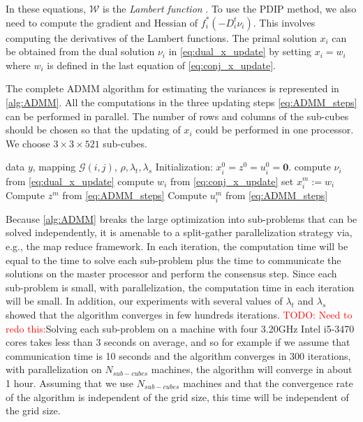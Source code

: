 \documentclass{article}
\newcommand{\attn}[1]{\textcolor{red}{TODO: #1}}
\begin{document}
In these equations, $\mathscr{W}$ is the \textit{Lambert function}
\citep{corless_lambertw_1996}. To use the PDIP method, we also need to
compute the gradient and Hessian of $f_i^*(-D_i^t\nu_i)$. This
involves computing the derivatives of the Lambert functions. The
primal solution $x_i$ can be obtained from the dual solution $\nu_i$
in \eqref{eq:dual_x_update} by setting $x_i=w_i$ where $w_i$ is
defined in the last equation of \eqref{eq:conj_x_update}.  

The complete ADMM algorithm for estimating the variances is
represented in \autoref{alg:ADMM}. All the computations in the three
updating steps \eqref{eq:ADMM_steps} can be performed in parallel. The
number of rows and columns of the sub-cubes should be chosen so that
the updating of $x_i$ could be performed in one processor. We choose
$3\times3\times521$ sub-cubes. 

\begin{algorithm}[tb]
  \caption{ADMM for sparse estimation of variance of spatio-temporal
    data \attn{Fix this}}
  \label{alg:ADMM}
  \begin{algorithmic}
     data $y$, mapping $\mathscr{G}(i,j)$,
    $\rho,\lambda_t,\lambda_s$ 
    \STATE Initialization: $x_i^0=z^0=u_i^0=\textbf{0}$.
    \STATE compute $\nu_i$ from \eqref{eq:dual_x_update}
    \STATE compute $w_i$ from \eqref{eq:conj_x_update}
    \STATE set $x_i^m:=w_i$
    \ENDFOR
    \STATE Compute $z^m$ from  \eqref{eq:ADMM_steps}
    \STATE Compute $u_i^m$ from  \eqref{eq:ADMM_steps}
    \ENDFOR
  \end{algorithmic}
\end{algorithm}

Because \autoref{alg:ADMM} breaks the large optimization into
sub-problems that can be solved independently, it is amenable to a
split-gather parallelization strategy via, e.g., the map reduce framework.
In each iteration, the
computation time will be equal to the time to solve each sub-problem
plus the time to communicate the solutions on the master processor
and perform the consensus step. Since each sub-problem is
small, with parallelization, the computation time in each iteration
will be small. In addition, our experiments with several values of
$\lambda_t$ and $\lambda_s$ showed that the algorithm converges in few
hundreds iterations. 
\attn{Need to redo this:}Solving each sub-problem on a machine with four
3.20GHz Intel i5-3470 cores takes less than 3 seconds on average, and
so for example if we assume that communication time is 10 seconds and
the algorithm converges in 300 iterations, with parallelization on
$N_{sub-cubes}$ machines, the algorithm will converge in about 1
hour. Assuming that we use $N_{sub-cubes}$ machines and that the
convergence rate of the algorithm is independent of the grid size,
this time will be independent of the grid size. 
\end{document}
